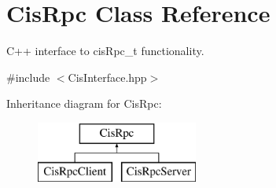 \hypertarget{classCisRpc}{}\section{Cis\+Rpc Class Reference}
\label{classCisRpc}


C++ interface to cis\+Rpc\+\_\+t functionality.  




{\ttfamily \#include $<$Cis\+Interface.\+hpp$>$}

Inheritance diagram for Cis\+Rpc\+:\begin{figure}[H]
\begin{center}
\leavevmode
\includegraphics[height=2.000000cm]{classCisRpc}
\end{center}
\end{figure}

